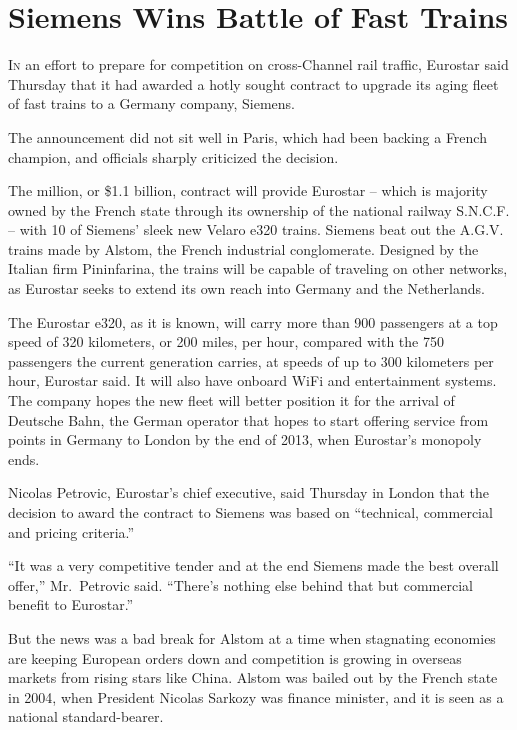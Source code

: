 ﻿\documentclass[12pt]{article}
\begin{document}
\section{Siemens Wins Battle of Fast Trains}

\lettrine{I}{n} an effort to prepare for competition on cross-Channel rail
traffic, Eurostar said Thursday that it had awarded a hotly sought contract to upgrade its aging
fleet of fast trains to a Germany company, Siemens.

The announcement did not sit well in Paris, which had been backing a French champion, and officials
sharply criticized the decision.

The  million, or \$1.1 billion, contract will provide Eurostar -- which is majority
owned by the French state through its ownership of the national railway S.N.C.F. -- with 10 of
Siemens' sleek new Velaro e320 trains. Siemens beat out the A.G.V. trains made by Alstom, the French
industrial conglomerate. Designed by the Italian firm Pininfarina, the trains will be capable of
traveling on other networks, as Eurostar seeks to extend its own reach into Germany and the
Netherlands.

The Eurostar e320, as it is known, will carry more than 900 passengers at a top speed of 320
kilometers, or 200 miles, per hour, compared with the 750 passengers the current generation carries,
at speeds of up to 300 kilometers per hour, Eurostar said. It will also have onboard WiFi and
entertainment systems. The company hopes the new fleet will better position it for the arrival of
Deutsche Bahn, the German operator that hopes to start offering service from points in Germany to
London by the end of 2013, when Eurostar's monopoly ends.

Nicolas Petrovic, Eurostar's chief executive, said Thursday in London that the decision to award the
contract to Siemens was based on ``technical, commercial and pricing criteria.''

``It was a very competitive tender and at the end Siemens made the best overall offer,''
Mr.~Petrovic said. ``There's nothing else behind that but commercial benefit to Eurostar.''

But the news was a bad break for Alstom at a time when stagnating economies are keeping European
orders down and competition is growing in overseas markets from rising stars like China. Alstom was
bailed out by the French state in 2004, when President Nicolas Sarkozy was finance minister, and it
is seen as a national standard-bearer.
\end{document}
